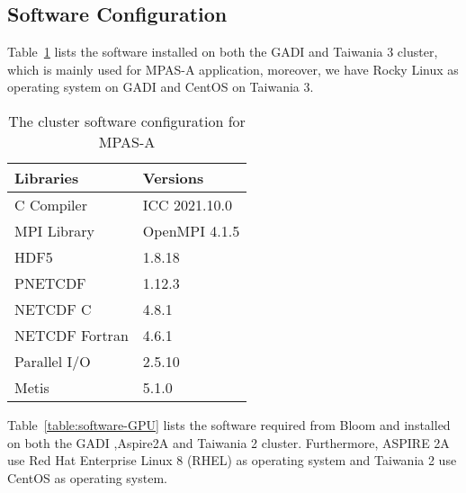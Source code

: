 \subsection{Software Configuration}
Table~\ref{table:software-CPU} lists the software installed on both the GADI and Taiwania 3 cluster, which is mainly used for MPAS-A application, moreover, we have Rocky Linux as operating system on GADI and CentOS on Taiwania 3.

\begin{table}[ht]
    \centering
    \caption{The cluster software configuration for MPAS-A}
    \begin{tabular}{ll}
        \toprule
        Libraries & Versions  \\
        \midrule
        C Compiler & ICC 2021.10.0 \\
        MPI Library & OpenMPI 4.1.5 \\
        HDF5 & 1.8.18 \\
        PNETCDF & 1.12.3 \\
        NETCDF C & 4.8.1 \\
        NETCDF Fortran & 4.6.1 \\
        Parallel I/O & 2.5.10 \\
        Metis & 5.1.0 \\
        \bottomrule
    \end{tabular}
    \label{table:software-CPU}
\end{table}

Table~\ref{table:software-GPU} lists the software required from Bloom and installed on both the GADI ,Aspire2A and Taiwania 2 cluster. Furthermore, ASPIRE 2A use Red Hat Enterprise Linux 8 (RHEL) as operating system and Taiwania 2 use CentOS as operating system.

